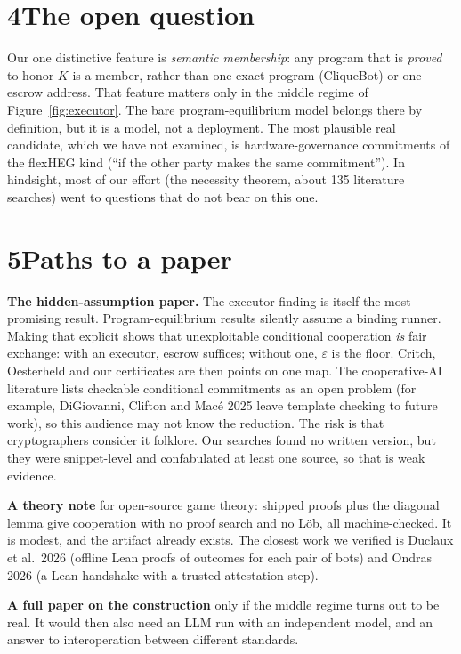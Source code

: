 \documentclass[11pt]{article}
\begin{document}
\section*{4\quad The open question}

Our one distinctive feature is \emph{semantic membership}: any program that is \emph{proved} to honor $K$ is a member, rather than one exact program (CliqueBot) or one escrow address. That feature matters only in the middle regime of Figure~\ref{fig:executor}. The bare program-equilibrium model belongs there by definition, but it is a model, not a deployment. The most plausible real candidate, which we have not examined, is hardware-governance commitments of the flexHEG kind (``if the other party makes the same commitment''). In hindsight, most of our effort (the necessity theorem, about 135 literature searches) went to questions that do not bear on this one.

\section*{5\quad Paths to a paper}

\textbf{The hidden-assumption paper.} The executor finding is itself the most promising result. Program-equilibrium results silently assume a binding runner. Making that explicit shows that unexploitable conditional cooperation \emph{is} fair exchange: with an executor, escrow suffices; without one, $\varepsilon$ is the floor. Critch, Oesterheld and our certificates are then points on one map. The cooperative-AI literature lists checkable conditional commitments as an open problem (for example, DiGiovanni, Clifton and Macé 2025 leave template checking to future work), so this audience may not know the reduction. The risk is that cryptographers consider it folklore. Our searches found no written version, but they were snippet-level and confabulated at least one source, so that is weak evidence.

\textbf{A theory note} for open-source game theory: shipped proofs plus the diagonal lemma give cooperation with no proof search and no Löb, all machine-checked. It is modest, and the artifact already exists. The closest work we verified is Duclaux et al.\ 2026 (offline Lean proofs of outcomes for each pair of bots) and Ondras 2026 (a Lean handshake with a trusted attestation step).

\textbf{A full paper on the construction} only if the middle regime turns out to be real. It would then also need an LLM run with an independent model, and an answer to interoperation between different standards.
\end{document}
